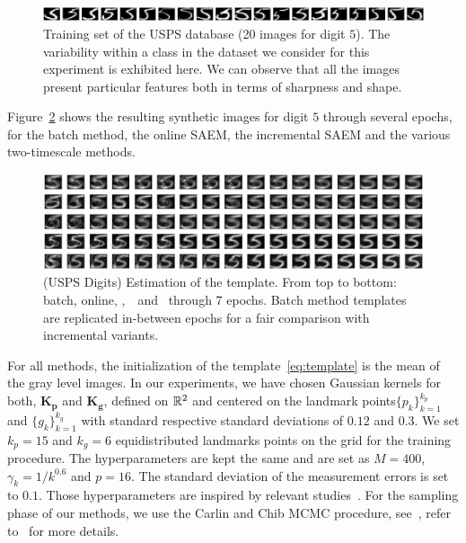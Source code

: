 \documentclass[12pt]{article}
\begin{document}
\vspace{0.2in}
\begin{figure}[H]
\includegraphics[width=\textwidth]{fig/variancedigit.png}
\caption{Training set of the USPS database (20 images for digit $5$). The variability within a class in the dataset we consider for this experiment is exhibited here. We can observe that all the images present particular features both in terms of sharpness and shape.}
\label{fig:variancedigit}
\end{figure}



Figure~\ref{fig:results} shows the resulting synthetic images for digit $5$ through several epochs, for the batch method, the online SAEM, the incremental SAEM and the various two-timescale methods.



\begin{figure}[t]
\includegraphics[width=\textwidth]{fig/deformable3}
\caption{(USPS Digits) Estimation of the template. From top to bottom: batch, online, \ISAEM,\ \SAEMVR\ and \FISAEM\ through 7 epochs. Batch method templates are replicated in-between epochs for a fair comparison with incremental variants. }
\label{fig:results}
\end{figure}


For all methods, the initialization of the template~\eqref{eq:template} is the mean of the gray level images.
In our experiments, we have chosen Gaussian kernels for both, $\mathbf{K}_{\mathbf{p}}$ and $\mathbf{K}_{\mathbf{g}}$, defined on $\mathbb{R}^2$ and centered on the landmark points$\{p_k\}_{k=1}^{k_p}$ and $\{g_k\}_{k=1}^{k_g}$ with standard respective standard deviations of $0.12$ and $0.3$. 
We set $k_p = 15$  and  $k_g = 6$ equidistributed landmarks points on the grid for the training procedure. 
The hyperparameters are kept the same and are set as $M = 400$, $ \gamma_k = 1/k^{0.6}$ and $ p = 16$.
The standard deviation of the measurement errors is set to $0.1$.
Those hyperparameters are inspired by relevant studies~\citep{allassonniere2010construction,allassonniere2013statistical}.
For the sampling phase of our methods, we use the Carlin and Chib MCMC procedure, see~\citet{carlin1995bayesian}, refer to~\citet{maire2016online} for more details.
\end{document}
